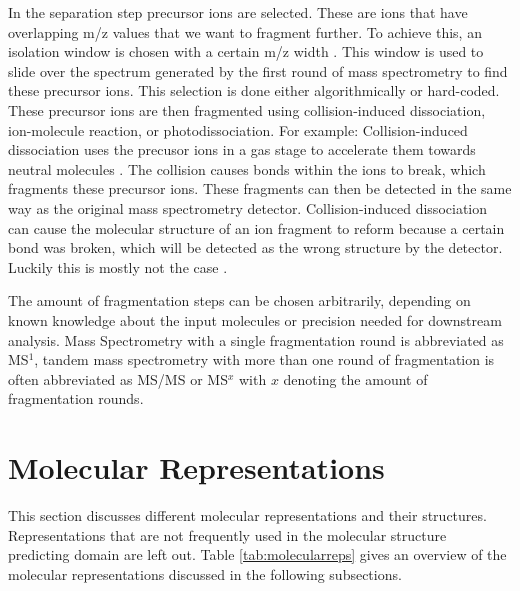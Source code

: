 In the separation step precursor ions are selected. These are ions that have overlapping m/z values that we want to fragment further. To achieve this, an isolation window is chosen with a certain m/z width \cite{defossez2023eight}. This window is used to slide over the spectrum generated by the first round of mass spectrometry to find these precursor ions. This selection is done either algorithmically or hard-coded. These precursor ions are then fragmented using collision-induced dissociation, ion-molecule reaction, or photodissociation. For example: Collision-induced dissociation uses the precusor ions in a gas stage to accelerate them towards neutral molecules \cite{wells2005collision}. The collision causes bonds within the ions to break, which fragments these precursor ions. These fragments can then be detected in the same way as the original mass spectrometry detector. Collision-induced dissociation can cause the molecular structure of an ion fragment to reform because a certain bond was broken, which will be detected as the wrong structure by the detector. Luckily this is mostly not the case \cite{molina2008comprehensive}.

The amount of fragmentation steps can be chosen arbitrarily, depending on known knowledge about the input molecules or precision needed for downstream analysis. Mass Spectrometry with a single fragmentation round is abbreviated as MS$^1$, tandem mass spectrometry with more than one round of fragmentation is often abbreviated as MS/MS or MS$^x$ with $x$ denoting the amount of fragmentation rounds.

\section{Molecular Representations}
\label{sec:molrepr}

This section discusses different molecular representations and their structures. Representations that are not frequently used in the molecular structure predicting domain are left out. Table \ref{tab:molecularreps} gives an overview of the molecular representations discussed in the following subsections.

